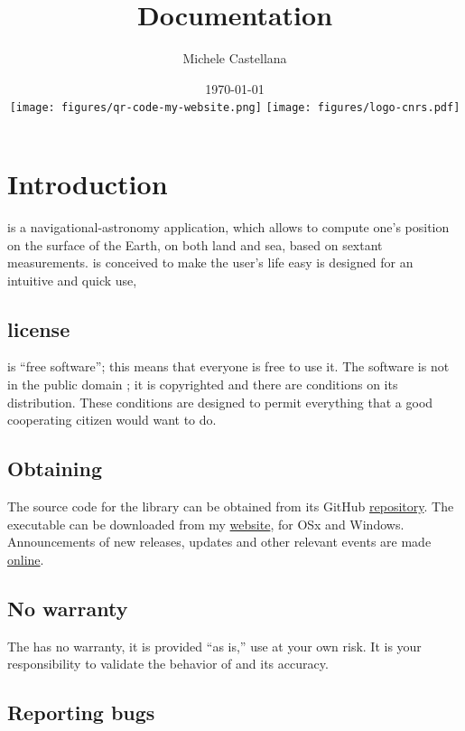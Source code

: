 \documentclass{ol-softwaremanual}
\title{Documentation}
\author{Michele Castellana}
\date{\today\\
\texttt{[image: figures/qr-code-my-website.png]}
\hspace{\stretch{2}} \texttt{[image: figures/logo-cnrs.pdf]}
}
\begin{document}
\maketitle

\tableofcontents
\newpage

\section{Introduction}


\thel  is a navigational-astronomy application, which allows to compute one's position on the surface of the Earth, on both land and sea, based on sextant measurements. \thel is conceived to make the user's life easy is designed for an intuitive and quick use, 

\subsection{\thel license}\label{sec-license}

\thel is ``free software''; this means that everyone is free to use it. The software is not in the public domain \cite{castellana2024thelemacus}; it is copyrighted and there are conditions on its distribution. These conditions are designed to permit everything that a good cooperating citizen would want to do.

\subsection{Obtaining \thel}

The source code for the library can be obtained from its  GitHub \href{https://github.com/mcastel1/thelemacus}{repository}. The executable can be downloaded from my \href{\thelemacusurl}{website}, for OSx and Windows.  Announcements of new releases, updates and other relevant events are made \href{\thelemacusurl}{online}. 

\subsection{No warranty}

The \thel has no warranty, it is provided ``as is,'' use at your own risk. It is your responsibility to validate the behavior of \thel and its accuracy. 

\subsection{Reporting bugs}
\end{document}
